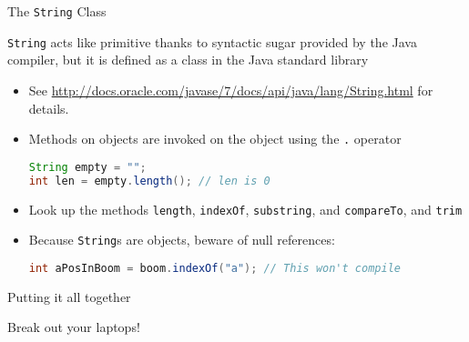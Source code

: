 \documentclass{beamer}
\begin{document}
\begin{frame}[fragile]{The {\tt String} Class}


{\tt String} acts like primitive thanks to syntactic sugar provided by the Java compiler, but it is defined as a class in the Java standard library

\begin{itemize}

\item See \url{http://docs.oracle.com/javase/7/docs/api/java/lang/String.html} for details.

\item Methods on objects are invoked on the object using the {\tt .} operator
\begin{lstlisting}[language=Java]
String empty = "";
int len = empty.length(); // len is 0
\end{lstlisting}

\item Look up the methods {\tt length}, {\tt indexOf}, {\tt substring}, and {\tt compareTo}, and {\tt trim}

\item Because {\tt String}s are objects, beware of null references:
\begin{lstlisting}[language=Java]
int aPosInBoom = boom.indexOf("a"); // This won't compile
\end{lstlisting}

\end{itemize}

\end{frame}

\begin{frame}[fragile]{Putting it all together}


Break out your laptops!

\end{frame}
\end{document}

